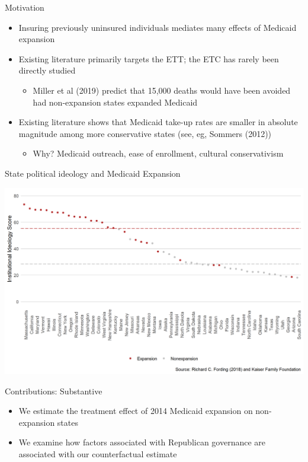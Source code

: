 \documentclass[hyperref={pdfpagelabels=false}]{beamer}
\begin{document}
\begin{frame}{Motivation}
    \begin{itemize}
    \item Insuring previously uninsured individuals mediates many effects of Medicaid expansion \bigskip
    \item Existing literature primarily targets the ETT; the ETC has rarely been directly studied \bigskip
    \begin{itemize}
        \item Miller et al (2019) predict that 15,000 deaths would have been avoided had non-expansion states expanded Medicaid \bigskip
    \end{itemize}
    \item Existing literature shows that Medicaid take-up rates are smaller in absolute magnitude among more conservative states (see, eg, Sommers (2012)) \bigskip
    \begin{itemize}
        \item Why? Medicaid outreach, ease of enrollment, cultural conservativism \bigskip
    \end{itemize}
    \end{itemize} 
\end{frame}

\begin{frame}{State political ideology and Medicaid Expansion}
    \begin{center}
	\includegraphics[scale=0.5]{01_Plots/political-expansion-plot.png}
    \end{center}
\end{frame}

\begin{frame}{Contributions: Substantive}
\begin{itemize}
    \item We estimate the treatment effect of 2014 Medicaid expansion on non-expansion states \bigskip
    
    \item We examine how factors associated with Republican governance are associated with our counterfactual estimate \bigskip
    
    \end{itemize}
\end{frame}
\end{document}
